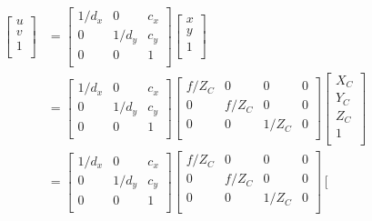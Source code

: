 \documentclass{article}
\begin{document}
\begin{tcolorbox}[colback=JungleGreen!10!Cerulean!15,colframe=CornflowerBlue!60!Black]
		\begin{equation*}
	\begin{aligned}
		\left[ \begin{array}{c}
			u\\
			v\\
			1\\
		\end{array} \right] &=\left[ \begin{matrix}
			1/d_x&		0&		c_x\\
			0&		1/d_y&		c_y\\
			0&		0&		1\\
		\end{matrix} \right] \left[ \begin{array}{c}
			x\\
			y\\
			1\\
		\end{array} \right] 
		\\
		&=\left[ \begin{matrix}
			1/d_x&		0&		c_x\\
			0&		1/d_y&		c_y\\
			0&		0&		1\\
		\end{matrix} \right] \left[ \begin{matrix}
			f/Z_C&		0&		0&		0\\
			0&		f/Z_C&		0&		0\\
			0&		0&		1/Z_C&		0\\
		\end{matrix} \right] \left[ \begin{array}{c}
			X_C\\
			Y_C\\
			Z_C\\
			1\\
		\end{array} \right] 
		\\
		&=\left[ \begin{matrix}
			1/d_x&		0&		c_x\\
			0&		1/d_y&		c_y\\
			0&		0&		1\\
		\end{matrix} \right] \left[ \begin{matrix}
			f/Z_C&		0&		0&		0\\
			0&		f/Z_C&		0&		0\\
			0&		0&		1/Z_C&		0\\
		\end{matrix} \right] \left[ \begin{matrix}

\end{matrix}
\end{aligned}
\end{equation*}
\end{tcolorbox}
\end{document}
